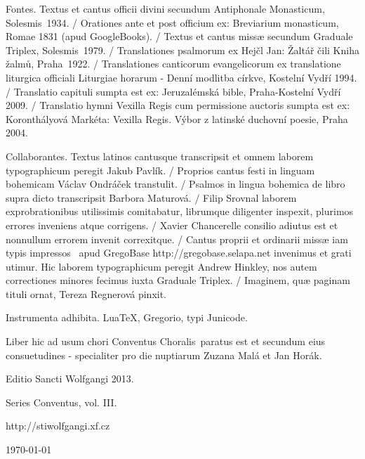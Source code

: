 \documentclass[a4paper, twoside, 12pt]{article}
\newcommand{\annusEditionis}{2013}
\begin{document}


\vfill

\pagebreak

\pagestyle{empty}

\tableofcontents

\vspace{3cm}

Fontes. 
Textus et cantus officii divini secundum Antiphonale Monasticum, Solesmis~1934. /
Orationes ante et post officium ex: 
Breviarium monasticum, Romae 1831 (apud GoogleBooks). /
Textus et cantus missæ secundum Graduale Triplex, Solesmis~1979. /
Translationes psalmorum ex Hejčl Jan: Žaltář čili Kniha žalmů, Praha~1922. /
Translationes canticorum evangelicorum ex translatione liturgica officiali
Liturgiae horarum - Denní modlitba církve, Kostelní Vydří 1994. /
Translatio capituli sumpta est ex: 
Jeruzalémská bible, Praha-Kostelní Vydří 2009. /
Translatio hymni Vexilla Regis cum permissione auctoris sumpta est ex:
Koronthályová Markéta: Vexilla Regis. Výbor z latinské duchovní poesie,
Praha 2004. 

Collaborantes.
Textus latinos cantusque transcripsit et omnem laborem typographicum peregit
Jakub Pavlík. /
Proprios cantus festi in linguam bohemicam Václav Ondráček transtulit. /
Psalmos in lingua bohemica de libro supra dicto transcripsit
Barbora Maturová. /
Filip Srovnal laborem exprobrationibus utilissimis comitabatur,
librumque diligenter inspexit, plurimos errores inveniens atque corrigens. /
Xavier Chancerelle consilio adiutus est et nonnullum errorem invenit
correxitque. /
Cantus proprii et ordinarii missæ 
iam \guillemotright typis impressos\guillemotleft\mbox{ }
apud GregoBase
http://gregobase.selapa.net invenimus et grati utimur. Hic laborem typographicum
peregit Andrew Hinkley, nos autem correctiones minores fecimus
iuxta Graduale Triplex. /
Imaginem, quæ paginam tituli ornat, Tereza Regnerová pinxit.

Instrumenta adhibita.
LuaTeX, %
Gregorio, %
typi Junicode. %

\begin{center}
Liber hic ad usum chori 
\guillemotright Conventus Choralis\guillemotleft\ 
paratus est
et secundum eius consuetudines -
specialiter pro die nuptiarum Zuzana Malá et Jan Horák.

\vspace{1cm}

{\large Editio Sancti Wolfgangi \annusEditionis .}

\vspace{2mm}

Series \guillemotright Conventus\guillemotleft, vol. III.

\vspace{1cm}

http://stiwolfgangi.xf.cz
\vfill

\today

\end{center}
\end{document}
